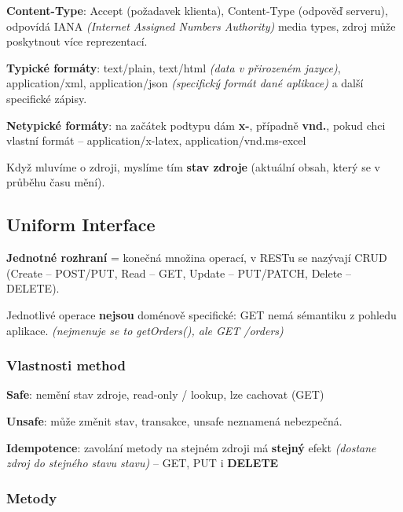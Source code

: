 \vspace{4pt}
\noindent \textbf{Content-Type}: Accept (požadavek klienta), Content-Type (odpověď serveru), odpovídá IANA \textit{(Internet Assigned Numbers Authority)} media types, zdroj může poskytnout více reprezentací.

\vspace{4pt}
\noindent \textbf{Typické formáty}: text/plain, text/html \textit{(data v přirozeném jazyce)}, application/xml, application/json \textit{(specifický formát dané aplikace)} a další specifické zápisy.

\vspace{4pt}
\noindent \textbf{Netypické formáty}: na začátek podtypu dám \textbf{x-}, případně \textbf{vnd.}, pokud chci vlastní formát -- application/x-latex, application/vnd.ms-excel

\vspace{4pt}
\noindent Když mluvíme o zdroji, myslíme tím \textbf{stav zdroje} (aktuální obsah, který se v průběhu času mění).

\subsection{Uniform Interface}

\textbf{Jednotné rozhraní} = konečná množina operací, v RESTu se nazývají CRUD (Create -- POST/PUT, Read -- GET, Update -- PUT/PATCH, Delete -- DELETE).

\vspace{4pt}
\noindent Jednotlivé operace \textbf{nejsou} doménově specifické: GET nemá sémantiku z pohledu aplikace. \textit{(nejmenuje se to getOrders(), ale GET /orders)}

\subsubsection*{Vlastnosti method}

\textbf{Safe}: nemění stav zdroje, read-only / lookup, lze cachovat (GET)

\vspace{2pt}
\noindent \textbf{Unsafe}: může změnit stav, transakce, unsafe neznamená nebezpečná.

\vspace{2pt}
\noindent \textbf{Idempotence}: zavolání metody na stejném zdroji má \textbf{stejný} efekt \textit{(dostane zdroj do stejného stavu stavu)} -- GET, PUT i \textbf{DELETE}

\subsubsection*{Metody}

